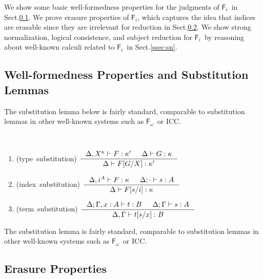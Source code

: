 \documentclass{llncs}
\newcommand{\Fi}{\ensuremath{\mathsf{F}_i}}
\newcommand{\Fw}{\ensuremath{\mathsf{F}_\omega}}
\renewcommand{\S}[0]{Sect.\;}
\begin{document}
We show some basic well-formedness properties for
the judgments of \Fi\ in \S\ref{ssec:wf}.
We prove erasure properties of \Fi, which captures the idea that indices are
erasable since they are irrelevant for reduction in \S\ref{ssec:erasure}.
We show strong normalization, logical consistence, and subject reduction for
\Fi\ by reasoning about well-known calculi related to \Fi\ in \S\ref{ssec:sn}.

\subsection{Well-formedness Properties and Substitution Lemmas} \label{ssec:wf}

The substitution lemma below is fairly standard,
comparable to substitution lemmas
in other well-known systems such as \Fw\ or ICC.
\begin{lemma}[substitution]\mbox{}\\[-3mm]
\label{lem:subst}
\begin{enumerate}
\item
\label{lem:tysubst}
\mbox{\rm (type substitution)}
$\inference{\Delta,X^\kappa |- F:\kappa' & \Delta |- G:\kappa}
	{\Delta |- F[G/X]:\kappa'} $
\medskip

\item
\label{lem:ixsubst}
\mbox{\rm (index substitution)}
$ \inference{\Delta,i^A |- F:\kappa & \Delta;\cdot |- s:A}
	{\Delta |- F[s/i]:\kappa} $
\medskip

\item
\label{lem:tmsubst}
\mbox{\rm (term substitution)}
$ \inference{\Delta;\Gamma,x:A |- t:B & \Delta;\Gamma |- s:A}
	{\Delta,\Gamma |- t[s/x]:B} $
\end{enumerate}
\end{lemma}
The substitution lemma is fairly standard, comparable to substitution lemmas
in other well-known systems such as \Fw\ or ICC.




\subsection{Erasure Properties} \label{ssec:erasure}
\end{document}
